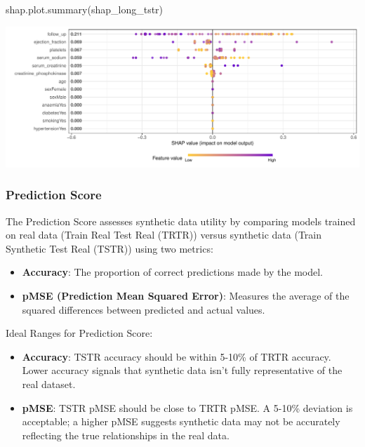 \documentclass[
  letterpaper,
  DIV=11,
  numbers=noendperiod]{scrartcl}
\newenvironment{Shaded}{\begin{snugshade}}{\end{snugshade}}
\newcommand{\FunctionTok}[1]{\textcolor[rgb]{0.28,0.35,0.67}{#1}}
\newcommand{\NormalTok}[1]{\textcolor[rgb]{0.00,0.23,0.31}{#1}}
\providecommand{\tightlist}{%
  \setlength{\itemsep}{0pt}\setlength{\parskip}{0pt}}\usepackage{longtable,booktabs,array}
\begin{document}
\begin{Shaded}
\begin{Highlighting}[]
\FunctionTok{shap.plot.summary}\NormalTok{(shap\_long\_tstr)}
\end{Highlighting}
\end{Shaded}

\begin{center}
\includegraphics[width=1\linewidth,height=\textheight,keepaspectratio]{heart_failure_synthetic_data_project_files/figure-pdf/Feature Importance Consistency Assessment-3.pdf}
\end{center}

\subsubsection{Prediction Score}\label{prediction-score}

The Prediction Score assesses synthetic data utility by comparing models
trained on real data (Train Real Test Real (TRTR)) versus synthetic data
(Train Synthetic Test Real (TSTR)) using two metrics:

\begin{itemize}
\tightlist
\item
  \textbf{Accuracy}: The proportion of correct predictions made by the
  model.
\item
  \textbf{pMSE (Prediction Mean Squared Error)}: Measures the average of
  the squared differences between predicted and actual values.
\end{itemize}

Ideal Ranges for Prediction Score:

\begin{itemize}
\tightlist
\item
  \textbf{Accuracy}: TSTR accuracy should be within 5-10\% of TRTR
  accuracy. Lower accuracy signals that synthetic data isn't fully
  representative of the real dataset.
\item
  \textbf{pMSE}: TSTR pMSE should be close to TRTR pMSE. A 5-10\%
  deviation is acceptable; a higher pMSE suggests synthetic data may not
  be accurately reflecting the true relationships in the real data.
\end{itemize}
\end{document}
